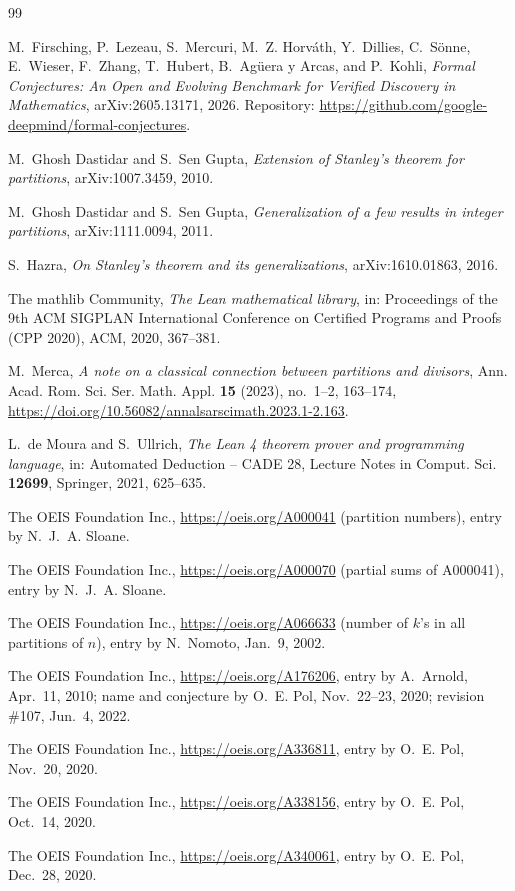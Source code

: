 \documentclass[11pt]{amsart}
\theoremstyle{plain}
\theoremstyle{definition}
\begin{document}
{\small
\begin{thebibliography}{99}

M.~Firsching, P.~Lezeau, S.~Mercuri, M.~Z. Horv\'ath, Y.~Dillies, C.~S\"onne, E.~Wieser, F.~Zhang, T.~Hubert, B.~Ag\"uera y Arcas, and P.~Kohli, \emph{Formal Conjectures: An Open and Evolving Benchmark for Verified Discovery in Mathematics}, arXiv:2605.13171, 2026. Repository: \url{https://github.com/google-deepmind/formal-conjectures}.

M.~Ghosh Dastidar and S.~Sen Gupta, \emph{Extension of Stanley's theorem for partitions}, arXiv:1007.3459, 2010.

M.~Ghosh Dastidar and S.~Sen Gupta, \emph{Generalization of a few results in integer partitions}, arXiv:1111.0094, 2011.

S.~Hazra, \emph{On Stanley's theorem and its generalizations}, arXiv:1610.01863, 2016.

The mathlib Community, \emph{The Lean mathematical library}, in: Proceedings of the 9th ACM SIGPLAN International Conference on Certified Programs and Proofs (CPP 2020), ACM, 2020, 367--381.

M.~Merca, \emph{A note on a classical connection between partitions and divisors}, Ann. Acad. Rom. Sci. Ser. Math. Appl. \textbf{15} (2023), no.~1--2, 163--174, \url{https://doi.org/10.56082/annalsarscimath.2023.1-2.163}.

L.~de Moura and S.~Ullrich, \emph{The Lean 4 theorem prover and programming language}, in: Automated Deduction -- CADE 28, Lecture Notes in Comput. Sci. \textbf{12699}, Springer, 2021, 625--635.

The OEIS Foundation Inc., \url{https://oeis.org/A000041} (partition numbers), entry by N.~J.~A. Sloane.

The OEIS Foundation Inc., \url{https://oeis.org/A000070} (partial sums of A000041), entry by N.~J.~A. Sloane.

The OEIS Foundation Inc., \url{https://oeis.org/A066633} (number of $k$'s in all partitions of $n$), entry by N.~Nomoto, Jan.~9, 2002.

The OEIS Foundation Inc., \url{https://oeis.org/A176206}, entry by A.~Arnold, Apr.~11, 2010; name and conjecture by O.~E. Pol, Nov.~22--23, 2020; revision \#107, Jun.~4, 2022.

The OEIS Foundation Inc., \url{https://oeis.org/A336811}, entry by O.~E. Pol, Nov.~20, 2020.

The OEIS Foundation Inc., \url{https://oeis.org/A338156}, entry by O.~E. Pol, Oct.~14, 2020.

The OEIS Foundation Inc., \url{https://oeis.org/A340061}, entry by O.~E. Pol, Dec.~28, 2020.

\end{thebibliography}
}
\end{document}
